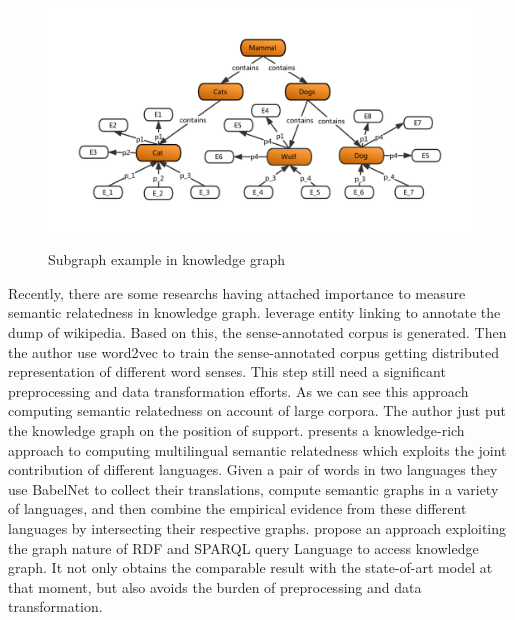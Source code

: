 \begin{figure}
    \centering
    \includegraphics[width=1.0\textwidth]{pic/introduction.pdf}\\
    \caption{Subgraph example in knowledge graph}
    \label{weak1}
\end{figure}

Recently, there are some researchs having attached importance to measure semantic relatedness
in knowledge graph\cite{aaai/Pirro12, aaai/NavigliP12, acl/IacobacciPN15}. 
\cite{acl/IacobacciPN15} leverage entity linking to annotate the dump of wikipedia. Based on this,
the sense-annotated corpus is generated. Then the author use word2vec to
train the sense-annotated corpus getting distributed representation of different 
word senses. This step still need a significant preprocessing and data transformation efforts. 
As we can see this approach computing semantic relatedness on account of large corpora.
The author just put the knowledge graph on the position of support. 
\cite{aaai/NavigliP12} presents a knowledge-rich approach to computing multilingual semantic
relatedness which exploits the joint contribution of different languages. Given a pair of words 
in two languages they use BabelNet to collect their translations, compute semantic
graphs in a variety of languages, and then combine the empirical evidence from these 
different languages by intersecting their respective graphs.
\cite{aaai/Pirro12} propose an approach exploiting the graph nature of RDF and SPARQL query
Language to access knowledge graph. It not only obtains the comparable
result with the state-of-art model at that moment, but also avoids the burden
of preprocessing and data transformation.

